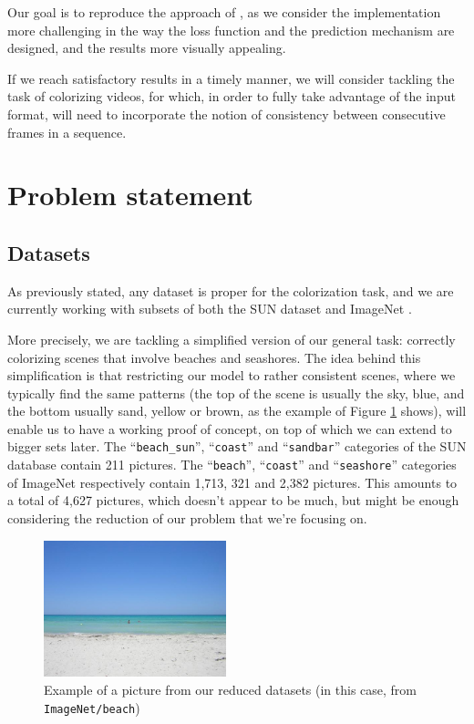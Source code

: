 \documentclass[10pt,twocolumn,letterpaper]{article}
\begin{document}
Our goal is to reproduce the approach of \cite{zhang2016colorful}, as we consider the implementation more challenging in the way the loss function and the prediction mechanism are designed, and the results more visually appealing.

If we reach satisfactory results in a timely manner, we will consider tackling the task of colorizing videos, for which, in order to fully take advantage of the input format, will need to incorporate the notion of consistency between consecutive frames in a sequence.

\section{Problem statement}

\subsection{Datasets}

As previously stated, any dataset is proper for the colorization task, and we are currently working with subsets of both the SUN dataset \cite{xiao2010sun} and ImageNet \cite{russakovsky2015imagenet}.

More precisely, we are tackling a simplified version of our general task: correctly colorizing scenes that involve beaches and seashores. The idea behind this simplification is that restricting our model to rather consistent scenes, where we typically find the same patterns (the top of the scene is usually the sky, \ie blue, and the bottom usually sand, \ie yellow or brown, as the example of Figure \ref{inex} shows), will enable us to have a working proof of concept, on top of which we can extend to bigger sets later. The ``\texttt{beach\_sun}'', ``\texttt{coast}'' and ``\texttt{sandbar}'' categories of the SUN database contain 211 pictures. The ``\texttt{beach}'', ``\texttt{coast}'' and ``\texttt{seashore}'' categories of ImageNet respectively contain 1,713, 321 and 2,382 pictures. This amounts to a total of 4,627 pictures, which doesn't appear to be much, but might be enough considering the reduction of our problem that we're focusing on.

\begin{figure}
\begin{center}
\includegraphics[width=200px]{img/beach.jpg}
\caption{Example of a picture from our reduced datasets (in this case, from \texttt{ImageNet/beach})}
\label{inex}
\end{center}
\end{figure}
\end{document}
